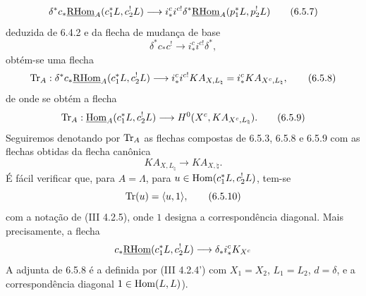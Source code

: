 \begin{equation}
\delta^*c_*\underline{\mathrm{RHom}}_A(c_1^*L,c_2^!L)
\longrightarrow
i_*^ci^{c!}\delta^*\underline{\mathrm{RHom}}_A(p_1^*L,p_2^!L)
\tag{6.5.7}
\end{equation}
deduzida de 6.4.2 e da flecha de mudança de base
\[
\delta^*c_*c^!\longrightarrow i_*^ci^{c!}\delta^*,
\]
obtém-se uma flecha
\begin{equation}
\operatorname{Tr}_A:\delta^*c_*\underline{\mathrm{RHom}}_A(c_1^*L,c_2^!L)
\longrightarrow
i_*^ci^{c!}KA_{X,L_{\natural}}
=i_*^cKA_{X^c,L_{\natural}},
\tag{6.5.8}
\end{equation}
de onde se obtém a flecha
\begin{equation}
\operatorname{Tr}_A:\underline{\operatorname{Hom}}_A(c_1^*L,c_2^!L)
\longrightarrow
H^0(X^c,KA_{X^c,L_{\natural}}).
\tag{6.5.9}
\end{equation}
Seguiremos denotando por $\operatorname{Tr}_A$ as flechas compostas de 6.5.3, 6.5.8 e 6.5.9 com as flechas obtidas da flecha canônica
\[
KA_{X,L_{\natural}}\longrightarrow KA_{X,\natural}.
\]
É fácil verificar que, para $A=\Lambda$, para $u\in\operatorname{Hom}(c_1^*L,c_2^!L)$, tem-se
\begin{equation}
\operatorname{Tr}(u)=\langle u,1\rangle,
\tag{6.5.10}
\end{equation}
com a notação de (III 4.2.5), onde $1$ designa a correspondência diagonal. Mais precisamente, a flecha
\[
c_*\underline{\mathrm{RHom}}(c_1^*L,c_2^!L)\longrightarrow \delta_*i_*^cK_{X^c}
\]
A adjunta de 6.5.8 é a definida por (III 4.2.4') com $X_1=X_2$, $L_1=L_2$, $d=\delta$, e a correspondência diagonal $1\in\operatorname{Hom}(L,L)$).
